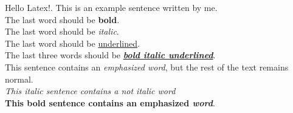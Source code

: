     \maketitle
    Hello Latex!. This is an example sentence written by me.
    \\
    The last word should be \textbf{bold}.      
    \\
    The last word should be \textit{italic}.
    \\
    The last word should be \underline{underlined}.
    \\
    The last three words should be \textbf{\textit{\underline{bold italic underlined}}}.
    \\
    This sentence contains an \emph{emphasized word}, but the rest of the text remains normal.
    \\
    \textit{This italic sentence contains a not italic \emph{word}}
    \\
    \textbf{This bold sentence contains an emphasized \emph{word}}.
    \\

